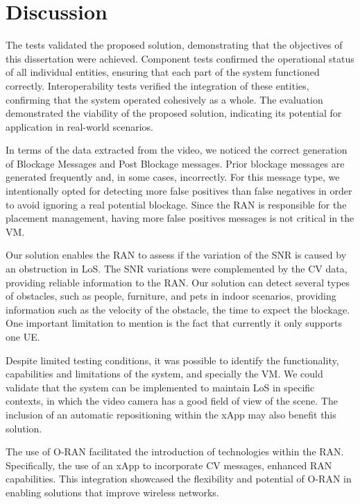 \section{Discussion}\label{sec:discuss}
The tests validated the proposed solution, demonstrating that the objectives of this dissertation were achieved.
Component tests confirmed the operational status of all individual entities, ensuring that each part of the system functioned correctly.
Interoperability tests verified the integration of these entities, confirming that the system operated cohesively as a whole.
The evaluation demonstrated the viability of the proposed solution, indicating its potential for application in real-world scenarios.

In terms of the data extracted from the video, we noticed the correct generation of Blockage Messages and Post Blockage messages.
Prior blockage messages are generated frequently and, in some cases, incorrectly.
For this message type, we intentionally opted for detecting more false positives than false negatives in order to avoid ignoring a real potential blockage.
Since the RAN is responsible for the placement management, having more false positives messages is not critical in the VM\@.

Our solution enables the RAN to assess if the variation of the SNR is caused by an obstruction in LoS\@.
The SNR variations were complemented by the CV data, providing reliable information to the RAN\@.
Our solution can detect several types of obstacles, such as people, furniture, and pets in indoor scenarios, providing information such as the velocity of the obstacle, the time to expect the blockage.
One important limitation to mention is the fact that currently it only supports one UE\@.

Despite limited testing conditions, it was possible to identify the functionality, capabilities and limitations of the system, and specially the VM\@.
We could validate that the system can be implemented to maintain LoS in specific contexts, in which the video camera has a good field of view of the scene.
The inclusion of an automatic repositioning within the xApp may also benefit this solution.

The use of O-RAN facilitated the introduction of technologies within the RAN\@.
Specifically, the use of an xApp to incorporate CV messages, enhanced RAN capabilities.
This integration showcased the flexibility and potential of O-RAN in enabling solutions that improve wireless networks.

